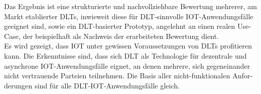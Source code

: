 \begin{otherlanguage}{ngerman}
	Das Ergebnis ist eine strukturierte und nachvollziehbare Bewertung mehrerer, am Markt etablierter DLTs, inwieweit diese für DLT-sinnvolle IOT-Anwendungsfälle geeignet sind, sowie ein DLT-basierter Prototyp, angelehnt an einen realen Use-Case, der beispielhaft als Nachweis der erarbeiteten Bewertung dient.\\
	Es wird gezeigt, dass IOT unter gewissen Voraussetzungen von DLTs profitieren kann. Die Erkenntnisse sind, dass sich DLT als Technologie für dezentrale und asynchrone IOT-Anwendungsfälle eignet, an denen mehrere, sich gegeneinander nicht vertrauende Parteien teilnehmen. Die Basis aller nicht-funktionalen Anforderungen sind für alle \ac{DLT}-\ac{IOT}-Anwendungsfälle gleich.
\end{otherlanguage}
